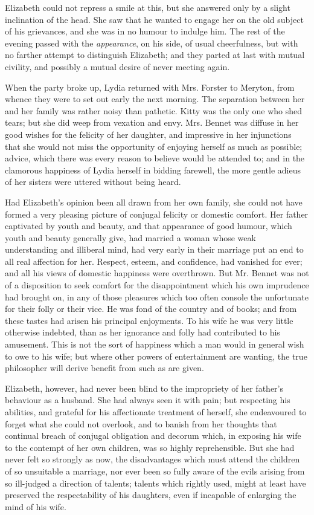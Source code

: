 Elizabeth could not repress a smile at this, but she
answered only by a slight inclination of the head. She
saw that he wanted to engage her on the old subject of
his grievances, and she was in no humour to indulge
him. The rest of the evening passed with the \textit{appearance},
on his side, of usual cheerfulness, but with no farther
attempt to distinguish Elizabeth; and they parted at last
with mutual civility, and possibly a mutual desire of never
meeting again.

When the party broke up, Lydia returned with Mrs.
Forster to Meryton, from whence they were to set out
early the next morning. The separation between her and
her family was rather noisy than pathetic. Kitty was the
only one who shed tears; but she did weep from vexation
and envy. Mrs. Bennet was diffuse in her good wishes
for the felicity of her daughter, and impressive in her
injunctions that she would not miss the opportunity of
enjoying herself as much as possible; advice, which there
was every reason to believe would be attended to; and
in the clamorous happiness of Lydia herself in bidding
farewell, the more gentle adieus of her sisters were uttered
without being heard.


Had Elizabeth’s opinion been all drawn from her own
family, she could not have formed a very pleasing picture
of conjugal felicity or domestic comfort. Her father
captivated by youth and beauty, and that appearance
of good humour, which youth and beauty generally give,
had married a woman whose weak understanding and
illiberal mind, had very early in their marriage put an
end to all real affection for her. Respect, esteem, and
confidence, had vanished for ever; and all his views of
domestic happiness were overthrown. But Mr. Bennet
was not of a disposition to seek comfort for the disappointment
which his own imprudence had brought on, in any
of those pleasures which too often console the unfortunate
for their folly or their vice. He was fond of the country
and of books; and from these tastes had arisen his
principal enjoyments. To his wife he was very little
otherwise indebted, than as her ignorance and folly had
contributed to his amusement. This is not the sort of
happiness which a man would in general wish to owe
to his wife; but where other powers of entertainment
are wanting, the true philosopher will derive benefit from
such as are given.

Elizabeth, however, had never been blind to the impropriety
of her father’s behaviour as a husband. She
had always seen it with pain; but respecting his abilities,
and grateful for his affectionate treatment of herself, she
endeavoured to forget what she could not overlook, and
to banish from her thoughts that continual breach of
conjugal obligation and decorum which, in exposing his
wife to the contempt of her own children, was so highly
reprehensible. But she had never felt so strongly as now,
the disadvantages which must attend the children of so
unsuitable a marriage, nor ever been so fully aware of the
evils arising from so ill-judged a direction of talents;
talents which rightly used, might at least have preserved
the respectability of his daughters, even if incapable of
enlarging the mind of his wife.

